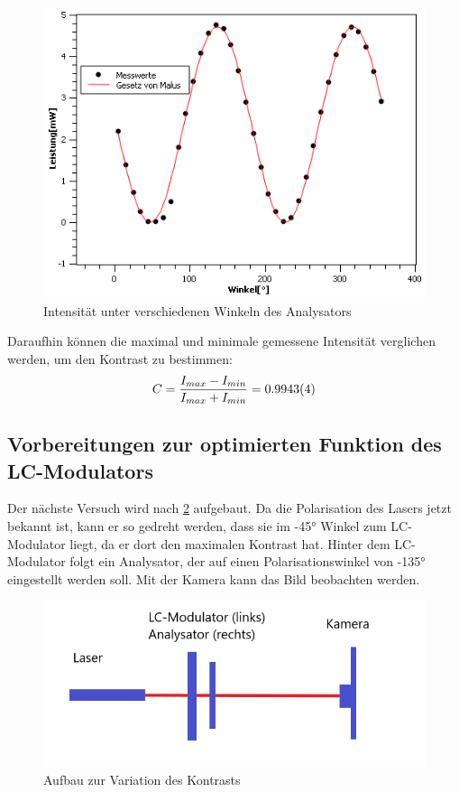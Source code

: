 \begin{figure}[h!]
	\centering
	\includegraphics[scale=0.8]{GesetzvonMalus.png}
	\caption{Intensität unter verschiedenen Winkeln des Analysators}
	\label{Malus}
\end{figure}

Daraufhin können die maximal und minimale gemessene Intensität verglichen werden, um den Kontrast zu bestimmen:
\begin{equation}
	C = \frac{I_{max} - I_{min}}{I_{max} + I_{min}} = \SI{0,9943 \pm 0,0004}{}
	\label{eq:Kontrast}
\end{equation}


\subsection{Vorbereitungen zur optimierten Funktion des LC-Modulators}
Der nächste Versuch wird nach \cref{412} aufgebaut. Da die Polarisation des Lasers jetzt bekannt ist, kann er so gedreht werden, dass sie im -45° Winkel zum LC-Modulator liegt, da er dort den maximalen Kontrast hat. Hinter dem LC-Modulator folgt ein Analysator, der auf einen Polarisationswinkel von -135° eingestellt werden soll. Mit der Kamera kann das Bild beobachten werden.

\begin{figure}[h!]
	\centering
	\includegraphics[scale=1]{4.1.2-Aufbau.png}
	\caption{Aufbau zur Variation des Kontrasts}
	\label{412}
\end{figure}

